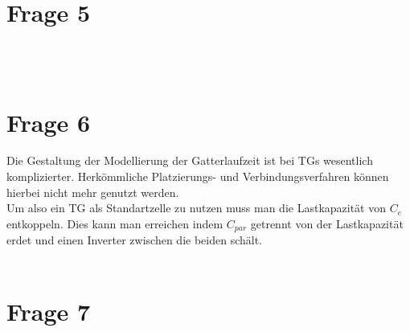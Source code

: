 \documentclass[a4paper]{scrartcl}
\begin{document}
\section*{Frage 5}

~\\
~\\
\section*{Frage 6}
Die Gestaltung  der Modellierung der Gatterlaufzeit ist bei TGs wesentlich komplizierter. Herkömmliche Platzierungs- und Verbindungsverfahren können hierbei nicht mehr genutzt werden.\\
Um also ein TG als Standartzelle zu nutzen muss man die Lastkapazität von $C_e$ entkoppeln. Dies kann man erreichen indem $C_{par}$ getrennt von der Lastkapazität erdet und einen Inverter zwischen die beiden schält.
~\\
~\\
\section*{Frage 7}

~\\
~\\
\end{document}
